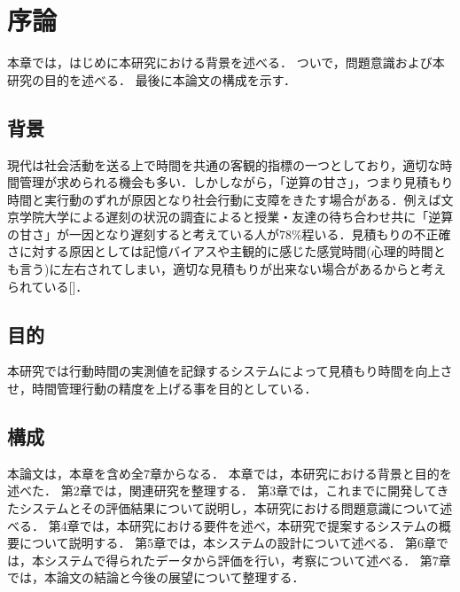 \chapter{序論}
本章では，はじめに本研究における背景を述べる．
ついで，問題意識および本研究の目的を述べる．
最後に本論文の構成を示す．

\section{背景}
現代は社会活動を送る上で時間を共通の客観的指標の一つとしており，適切な時間管理が求められる機会も多い．しかしながら，「逆算の甘さ」，つまり見積もり時間と実行動のずれが原因となり社会行動に支障をきたす場合がある．例えば文京学院大学による遅刻の状況の調査によると授業・友達の待ち合わせ共に「逆算の甘さ」が一因となり遅刻すると考えている人が78\%程いる\cite{bunkyo}．見積もりの不正確さに対する原因としては記憶バイアスや主観的に感じた感覚時間(心理的時間とも言う)に左右されてしまい，適切な見積もりが出来ない場合があるからと考えられている[]．

\section{目的}
本研究では行動時間の実測値を記録するシステムによって見積もり時間を向上させ，時間管理行動の精度を上げる事を目的としている．

\section{構成}
本論文は，本章を含め全7章からなる．
本章では，本研究における背景と目的を述べた．
第2章では，関連研究を整理する．
第3章では，これまでに開発してきたシステムとその評価結果について説明し，本研究における問題意識について述べる．
第4章では，本研究における要件を述べ，本研究で提案するシステムの概要について説明する．
第5章では，本システムの設計について述べる．
第6章では，本システムで得られたデータから評価を行い，考察について述べる．
第7章では，本論文の結論と今後の展望について整理する．